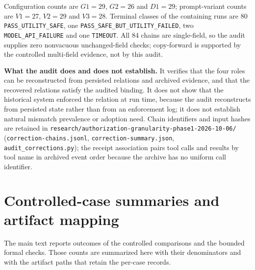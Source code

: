 \documentclass[10pt,a4paper]{article}
\begin{document}
Configuration counts are $G1=29$, $G2=26$ and $D1=29$; prompt-variant counts are $V1=27$, $V2=29$ and $V3=28$. Terminal classes of the containing runs are 80 \texttt{PASS\_UTILITY\_SAFE}, one \texttt{PASS\_SAFE\_BUT\_UTILITY\_FAILED}, two \texttt{MODEL\_API\_FAILURE} and one \texttt{TIMEOUT}. All 84 chains are single-field, so the audit supplies zero nonvacuous unchanged-field checks; copy-forward is supported by the controlled multi-field evidence, not by this audit.

\textbf{What the audit does and does not establish.} It verifies that the four roles can be reconstructed from persisted relations and archived evidence, and that the recovered relations satisfy the audited binding. It does not show that the historical system enforced the relation at run time, because the audit reconstructs from persisted state rather than from an enforcement log; it does not establish natural mismatch prevalence or adoption need. Chain identifiers and input hashes are retained in \nolinkurl{research/authorization-granularity-phase1-2026-10-06/} (\texttt{correction-chains.jsonl}, \texttt{correction-summary.json}, \texttt{audit\_corrections.py}); the receipt association pairs tool calls and results by tool name in archived event order because the archive has no uniform call identifier.

\section{Controlled-case summaries and artifact mapping}
The main text reports outcomes of the controlled comparisons and the bounded formal checks. Those counts are summarized here with their denominators and with the artifact paths that retain the per-case records.
\end{document}
